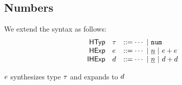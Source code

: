 
\subsection{Numbers}
We extend the syntax as follows:
\[
\begin{array}{rllllll}
\mathsf{HTyp} & \htau & ::= \cdots ~\vert~ \tnum
\\
\mathsf{HExp} & \hexp & ::= \cdots
~\vert~ \hnum{n}
~\vert~ \hadd{\hexp}{\hexp}
\\
\mathsf{IHExp} & \dexp & ::= \cdots
~\vert~ \dnum{n}
~\vert~ \dadd{\dexp}{\dexp}
\end{array}
\]


\vsepRule

\judgbox
  {\expandSyn{\hGamma}{\hexp}{\htau}{\dexp}{\Delta}}
  {$\hexp$ synthesizes type $\htau$ and expands to $\dexp$}
\begin{mathpar}


\end{mathpar}


\begin{mathpar}


\end{mathpar}

